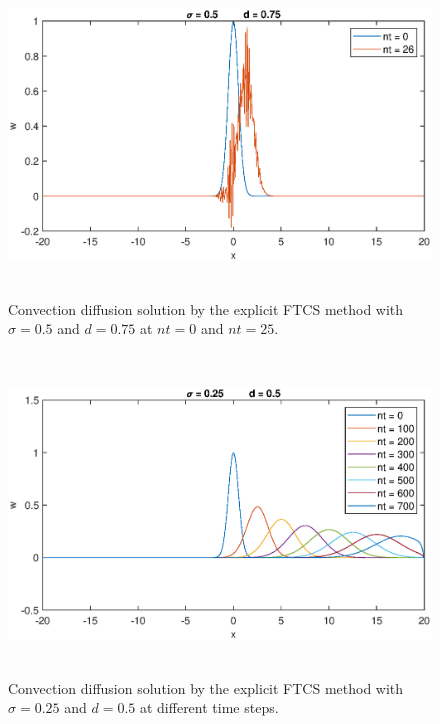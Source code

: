 \documentclass[letterpaper,12pt]{article}
\begin{document}
\begin{figure}[!ht] 
	\centering 
	\includegraphics[max height=8.5cm]{graphs/FTCS/ConvectionDiffusion/sigma05d075.eps}
	\caption{Convection diffusion solution by the explicit FTCS method with $\sigma= 0.5$ and $d=0.75$ at $nt=0$ and $nt=25$.}
	 \label{fig:FTCSsigma05d075}
\end{figure}
\begin{figure}[!ht] 
	\centering 
	\includegraphics[max height=8.5cm]{graphs/FTCS/ConvectionDiffusion/sigma025d05.eps}
	\caption{Convection diffusion solution by the explicit FTCS method with $\sigma= 0.25$ and $d=0.5$ at different time steps.}
	 \label{fig:FTCSsigma025d05}
\end{figure}
\newpage
\end{document}
